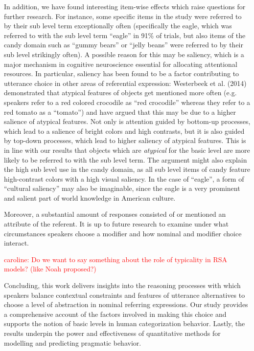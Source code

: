 \documentclass[10pt,letterpaper]{article}
\newcommand{\red}[1]{\textcolor{Red}{#1}}
\begin{document}
In addition, we have found interesting item-wise effects which raise questions for further research. For instance, some specific items in the study were referred to by their sub level term exceptionally often (specifically the eagle, which was referred to with the sub level term ``eagle'' in 91\% of trials, but also items of the candy domain such as ``gummy bears'' or ``jelly beans'' were referred to by their sub level strikingly often). A possible reason for this may be saliency, which is a major mechanism in cognitive neuroscience essential for allocating attentional resources. In particular, saliency has been found to be a factor contributing to utterance choice in other areas of referential expression: Westerbeek et al. (2014) demonstrated that atypical features of objects get mentioned more often (e.g. speakers refer to a red colored crocodile as ``red crocodile'' whereas they refer to a red tomato as a ``tomato'') and have argued that this may be due to a higher salience of atypical features. Not only is attention guided by bottom-up processes, which lead to a salience of bright colors and high contrasts, but it is also guided by top-down processes, which lead to higher saliency of atypical features. This is in line with our results that objects which are \emph{atypical} for the basic level are more likely to be referred to with the sub level term. The argument might also explain the high sub level use in the candy domain, as all sub level items of candy feature high-contrast colors with a high visual saliency. In the case of ``eagle'', a form of ``cultural saliency'' may also be imaginable, since the eagle is a very prominent and salient part of world knowledge in American culture. 


Moreover, a substantial amount of responses consisted of or mentioned an attribute of the referent. It is up to future research to examine under what circumstances speakers choose a modifier and how nominal and modifier choice interact.

\red{caroline: Do we want to say something about the role of typicality in RSA models? (like Noah proposed?)}

Concluding, this work delivers insights into the reasoning processes with which speakers balance contextual constraints and features of utterance alternatives to choose a level of abstraction in nominal referring expressions. Our study provides a comprehensive account of the factors involved in making this choice and supports the notion of basic levels in human categorization behavior. Lastly, the results underpin the power and effectiveness of quantitative methods for modelling and predicting pragmatic behavior.
\end{document}
